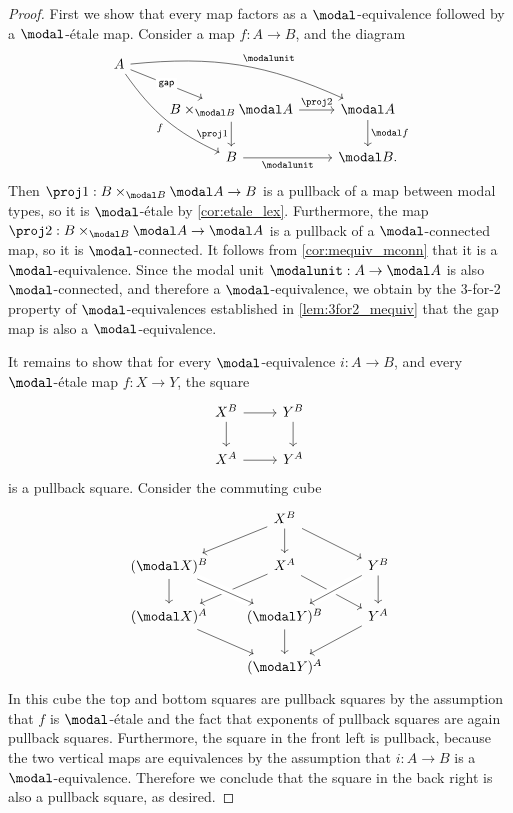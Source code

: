 \documentclass{msc}
\begin{document}
\begin{proof}
  First we show that every map factors as a $\modal$-equivalence followed by a $\modal$-\'etale map. Consider a map $f:A\to B$, and the diagram
\begin{equation*}
\begin{tikzcd}
A \arrow[ddr,bend right=15,swap,"f"] \arrow[drr,bend left=15,"\modalunit"] \arrow[dr,"\mathsf{gap}" description] \\
& B\times_{\modal B} \modal A \arrow[d,swap,"\proj 1"] \arrow[r,"\proj 2"] & \modal A \arrow[d,"\modal f"] \\
& B \arrow[r,swap,"\modalunit"] & \modal B.
\end{tikzcd}
\end{equation*}
Then $\proj 1:B\times_{\modal B} \modal A\to B$ is a pullback of a map between modal types, so it is $\modal$-\'etale by \cref{cor:etale_lex}. Furthermore, the map $\proj 2:B\times_{\modal B}\modal A\to \modal A$ is a pullback of a $\modal$-connected map, so it is $\modal$-connected. It follows from \cref{cor:mequiv_mconn} that it is a $\modal$-equivalence. Since the modal unit $\modalunit :A\to\modal A$ is also $\modal$-connected, and therefore a $\modal$-equivalence, we obtain by the 3-for-2 property of $\modal$-equivalences established in \cref{lem:3for2_mequiv} that the gap map is also a $\modal$-equivalence.
  
It remains to show that for every $\modal$-equivalence $i:A\to B$, and every $\modal$-\'etale map $f:X\to Y$, the square
\begin{equation*}
\begin{tikzcd}
X^B \arrow[r] \arrow[d] & Y^B \arrow[d] \\
X^A \arrow[r] & Y^A
\end{tikzcd}
\end{equation*}
is a pullback square. Consider the commuting cube
\begin{equation*}
\begin{tikzcd}
&[-1ex] X^B \arrow[dl] \arrow[d] \arrow[dr] \\
(\modal X)^B \arrow[d] & X^A \arrow[dl] \arrow[dr] & Y^B \arrow[d] \arrow[dl,crossing over] \\
(\modal X)^A \arrow[dr] & (\modal Y)^B \arrow[from=ul,crossing over] \arrow[d] & Y^A \arrow[dl] \\
& (\modal Y)^A
\end{tikzcd}
\end{equation*}
In this cube the top and bottom squares are pullback squares by the assumption that $f$ is $\modal$-\'etale and the fact that exponents of pullback squares are again pullback squares. Furthermore, the square in the front left is pullback, because the two vertical maps are equivalences by the assumption that $i:A\to B$ is a $\modal$-equivalence. Therefore we conclude that the square in the back right is also a pullback square, as desired.
\end{proof}
\end{document}

